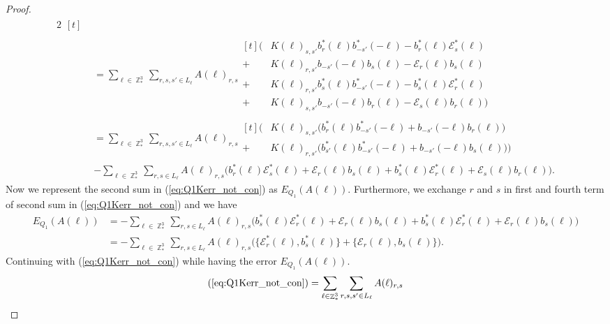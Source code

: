 \documentclass[sn-mathphys,Numbered, a4paper ,nocrop]{sn-jnl}%
\DeclareMathOperator{\Z}{\mathbb{Z}}
\theoremstyle{plain}
\theoremstyle{definition}
\theoremstyle{remark}
\theoremstyle{plain}
\theoremstyle{definition}
\theoremstyle{remark}
\begin{document}
\begin{proof}
\begin{alignat}{2}
\begin{aligned}[t]
    \end{aligned}\\
    &=\sum\limits_{\ell \in \Z^3_*}\sum\limits_{r,s,s' \in L_{\ell}}A(\ell)_{r,s}\begin{aligned}[t]
        \Big(&K(\ell)_{s,s'}b^*_{r}(\ell)b^*_{-s'}(-\ell) -b^*_{r}(\ell) \mathcal{E}^*_{s}(\ell)\\ + &K(\ell)_{r,s'}b_{-s'}(-\ell)b_{s}(\ell) - \mathcal{E}_{r}(\ell)b_{s}(\ell)\\+& K(\ell)_{r,s'}b^*_{s}(\ell)b^*_{-s'}(-\ell) - b^*_{s}(\ell)\mathcal{E}^*_{r}(\ell)\\ + &K(\ell)_{s,s'}b_{-s'}(-\ell)b_{r}(\ell) - \mathcal{E}_{s}(\ell)b_{r}(\ell) \Big) 
    \end{aligned}\\
    &=\sum\limits_{\ell \in \Z^3_*}\sum\limits_{r,s,s' \in L_{\ell}}A(\ell)_{r,s}\begin{aligned}[t]
        \Big(&K(\ell)_{s,s'}\big(b^*_{r}(\ell)b^*_{-s'}(-\ell)+b_{-s'}(-\ell)b_{r}(\ell)\big)\\ + &K(\ell)_{r,s'}\big(b^*_{s'}(\ell)b^*_{-s'}(-\ell) +b_{-s'}(-\ell)b_{s}(\ell) \big)\Big) 
    \end{aligned}\nonumber\\
    &-\sum\limits_{\ell \in \Z^3_*}\sum\limits_{r,s \in L_{\ell}}A(\ell)_{r,s}\Big(b^*_{r}(\ell)\mathcal{E}^*_{s}(\ell) + \mathcal{E}_{r}(\ell)b_{s}(\ell) + b^*_{s}(\ell)\mathcal{E}^*_{r}(\ell) + \mathcal{E}_{s}(\ell)b_{r}(\ell)\Big).\label{eq:Q1Kerr_not_con}
\end{alignat}
Now we represent the second sum in (\ref{eq:Q1Kerr_not_con}) as $E_{Q_1}(A(\ell))$. Furthermore, we exchange $r$ and $s$ in first and fourth term of second sum in (\ref{eq:Q1Kerr_not_con}) and we have
\begin{align}
    E_{Q_1}(A(\ell))&= -\sum\limits_{\ell \in \Z^3_*}\sum\limits_{r,s \in L_{\ell}}A(\ell)_{r,s}\Big(b^*_{s}(\ell)\mathcal{E}^*_{r}(\ell) + \mathcal{E}_{r}(\ell)b_{s}(\ell) + b^*_{s}(\ell)\mathcal{E}^*_{r}(\ell) + \mathcal{E}_{r}(\ell)b_{s}(\ell)\Big)\\
    &= -\sum\limits_{\ell \in \Z^3_*}\sum\limits_{r,s \in L_{\ell}}A(\ell)_{r,s}\Big(\big\{\mathcal{E}^*_{r}(\ell),b^*_{s}(\ell)\big\} + \big\{\mathcal{E}_{r}(\ell),b_{s}(\ell)\big\}\Big).
\end{align}
Continuing with (\ref{eq:Q1Kerr_not_con}) while having the error $E_{Q_1}(A(\ell))$.
\begin{align}
    (\ref{eq:Q1Kerr_not_con}) = \sum\limits_{\ell \in \Z^3_*}\sum\limits_{r,s,s' \in L_{\ell}}A(\ell)_{r,s}

\end{align}
\end{proof}
\end{document}
